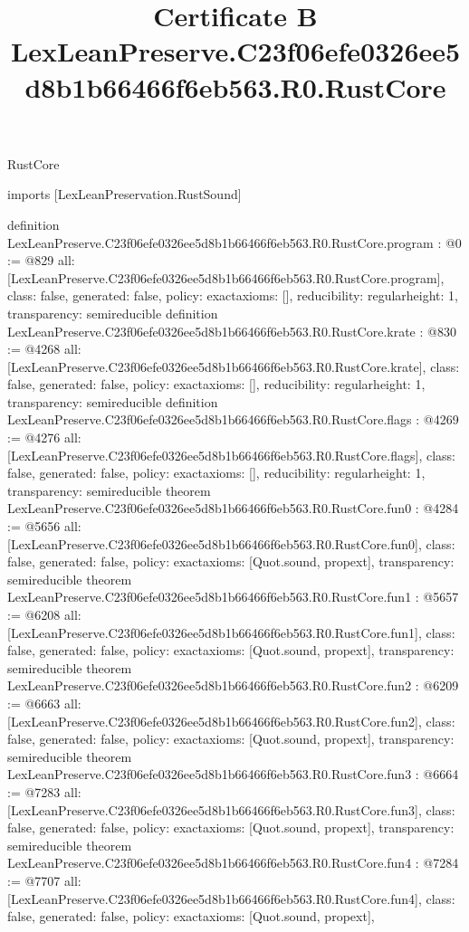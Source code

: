 \begin{lexlean}{RustCore}
\title{Certificate B LexLeanPreserve.C23f06efe0326ee5d8b1b66466f6eb563.R0.RustCore}
\begin{coremodule}
imports [LexLeanPreservation.RustSound]

definition LexLeanPreserve.C23f06efe0326ee5d8b1b66466f6eb563.R0.RustCore.program : @0 := @829 {
  all: [LexLeanPreserve.C23f06efe0326ee5d8b1b66466f6eb563.R0.RustCore.program],
  class: false,
  generated: false,
  policy: exact{axioms: []},
  reducibility: regular{height: 1},
  transparency: semireducible
}
definition LexLeanPreserve.C23f06efe0326ee5d8b1b66466f6eb563.R0.RustCore.krate : @830 := @4268 {
  all: [LexLeanPreserve.C23f06efe0326ee5d8b1b66466f6eb563.R0.RustCore.krate],
  class: false,
  generated: false,
  policy: exact{axioms: []},
  reducibility: regular{height: 1},
  transparency: semireducible
}
definition LexLeanPreserve.C23f06efe0326ee5d8b1b66466f6eb563.R0.RustCore.flags : @4269 := @4276 {
  all: [LexLeanPreserve.C23f06efe0326ee5d8b1b66466f6eb563.R0.RustCore.flags],
  class: false,
  generated: false,
  policy: exact{axioms: []},
  reducibility: regular{height: 1},
  transparency: semireducible
}
theorem LexLeanPreserve.C23f06efe0326ee5d8b1b66466f6eb563.R0.RustCore.fun0 : @4284 := @5656 {
  all: [LexLeanPreserve.C23f06efe0326ee5d8b1b66466f6eb563.R0.RustCore.fun0],
  class: false,
  generated: false,
  policy: exact{axioms: [Quot.sound, propext]},
  transparency: semireducible
}
theorem LexLeanPreserve.C23f06efe0326ee5d8b1b66466f6eb563.R0.RustCore.fun1 : @5657 := @6208 {
  all: [LexLeanPreserve.C23f06efe0326ee5d8b1b66466f6eb563.R0.RustCore.fun1],
  class: false,
  generated: false,
  policy: exact{axioms: [Quot.sound, propext]},
  transparency: semireducible
}
theorem LexLeanPreserve.C23f06efe0326ee5d8b1b66466f6eb563.R0.RustCore.fun2 : @6209 := @6663 {
  all: [LexLeanPreserve.C23f06efe0326ee5d8b1b66466f6eb563.R0.RustCore.fun2],
  class: false,
  generated: false,
  policy: exact{axioms: [Quot.sound, propext]},
  transparency: semireducible
}
theorem LexLeanPreserve.C23f06efe0326ee5d8b1b66466f6eb563.R0.RustCore.fun3 : @6664 := @7283 {
  all: [LexLeanPreserve.C23f06efe0326ee5d8b1b66466f6eb563.R0.RustCore.fun3],
  class: false,
  generated: false,
  policy: exact{axioms: [Quot.sound, propext]},
  transparency: semireducible
}
theorem LexLeanPreserve.C23f06efe0326ee5d8b1b66466f6eb563.R0.RustCore.fun4 : @7284 := @7707 {
  all: [LexLeanPreserve.C23f06efe0326ee5d8b1b66466f6eb563.R0.RustCore.fun4],
  class: false,
  generated: false,
  policy: exact{axioms: [Quot.sound, propext]},
}
\end{coremodule}
\end{lexlean}
